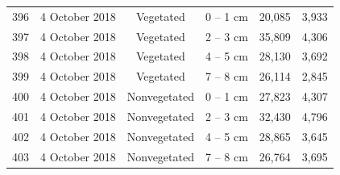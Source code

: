 \documentclass[12pt,]{article}
\begin{document}
\begin{longtable}[t]{cccccc}
396 & 4 October 2018 & Vegetated & 0 – 1 cm & 20,085 & 3,933\\
397 & 4 October 2018 & Vegetated & 2 – 3 cm & 35,809 & 4,306\\
398 & 4 October 2018 & Vegetated & 4 – 5 cm & 28,130 & 3,692\\
399 & 4 October 2018 & Vegetated & 7 – 8 cm & 26,114 & 2,845\\
400 & 4 October 2018 & Nonvegetated & 0 – 1 cm & 27,823 & 4,307\\
401 & 4 October 2018 & Nonvegetated & 2 – 3 cm & 32,430 & 4,796\\
402 & 4 October 2018 & Nonvegetated & 4 – 5 cm & 28,865 & 3,645\\
403 & 4 October 2018 & Nonvegetated & 7 – 8 cm & 26,764 & 3,695\\*
\end{longtable}
\endgroup{}



\newpage


\end{document}
